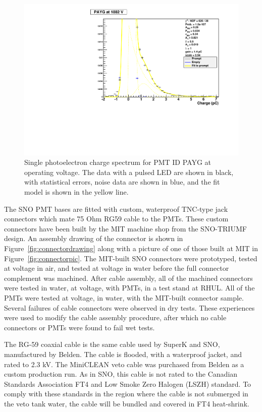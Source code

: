 \documentclass{JINST}
\begin{document}
\begin{figure}[ht]
\begin{center}
\includegraphics[width=4.5in]{graphics/PAYG_singlePE.pdf}
\caption{Single photoelectron charge spectrum for PMT ID PAYG at operating voltage.  The data with a pulsed LED are shown in black, with statistical errors, noise data are shown in blue, and the fit model is shown in the yellow line.
\label{fig:pmt_spe_q}}
\end{center}
\end{figure}

The SNO PMT bases are fitted with custom, waterproof TNC-type jack
connectors which mate 75 Ohm RG59 cable to the PMTs.  These custom
connectors have been built by the MIT machine shop from the SNO-TRIUMF
design. An assembly drawing of the connector is shown in
Figure~\ref{fig:connectordrawing} along with a picture of one of those
built at MIT in Figure~\ref{fig:connectorpic}. The MIT-built SNO
connectors were prototyped, tested at voltage in air, and tested at
voltage in water before the full connector complement was machined.
After cable assembly, all of the machined connectors were tested in
water, at voltage, with PMTs, in a test stand at RHUL.  All of the
PMTs were tested at voltage, in water, with the MIT-built connector
sample.  Several failures of cable connectors were observed in dry
tests.  These experiences were used to modify the cable assembly
procedure, after which no cable connectors or PMTs were found to fail
wet tests.

The RG-59 coaxial cable is the same cable used by SuperK and SNO,
manufactured by Belden.  The cable is flooded, with a waterproof
jacket, and rated to 2.3 kV.  The MiniCLEAN veto cable was purchased
from Belden as a custom production run.  
As in SNO, this cable is not rated to the Canadian Standards Association
FT4 and Low Smoke Zero Halogen (LSZH) standard.  To comply with these
standards in the region where the cable is not submerged in the veto tank
water, the cable will be bundled and covered in FT4 heat-shrink.
\end{document}
